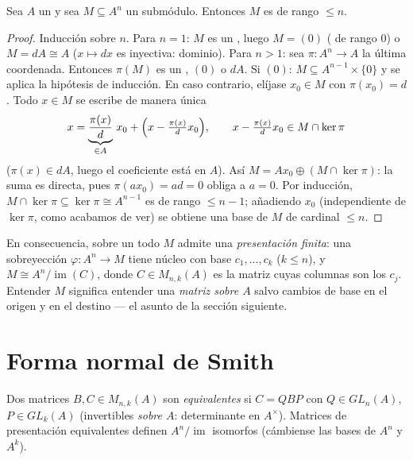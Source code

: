 \begin{theorem}\label{thm:b3:modules:submodule}
Sea $A$ un  y sea $M \subseteq A^n$ un
submódulo. Entonces $M$ es  de rango
$\leq n$.
\end{theorem}

\begin{proof}
Inducción sobre $n$. Para $n = 1$: $M$ es un
, luego $M = (0)$
( de rango $0$) o $M = dA \cong A$
($x \mapsto dx$ es inyectiva: dominio). Para $n > 1$: sea
$\pi \colon A^n \to A$ la última coordenada. Entonces $\pi(M)$ es un
, $(0)$ o $dA$. Si $(0)$:
$M \subseteq A^{n-1} \times \{0\}$ y se aplica la hipótesis de
inducción. En caso contrario, elíjase $x_0 \in M$ con $\pi(x_0) = d$.
Todo $x \in M$ se escribe de manera única
\[
x = \underbrace{\frac{\pi(x)}{d}}_{\in A}\, x_0 +
\Bigl(x - \tfrac{\pi(x)}d x_0\Bigr),
\qquad x - \tfrac{\pi(x)}d x_0 \in M \cap \ker\pi
\]
($\pi(x) \in dA$, luego el coeficiente está en $A$). Así $M = Ax_0
\oplus (M \cap \ker \pi)$: la suma es directa, pues $\pi(ax_0) =
ad = 0$ obliga a $a = 0$. Por inducción, $M \cap \ker\pi \subseteq
\ker \pi \cong A^{n-1}$ es  de rango
$\leq n - 1$; añadiendo $x_0$ (independiente de $\ker\pi$, como acabamos
de ver) se obtiene una base de $M$ de cardinal $\leq n$.
\end{proof}

\begin{remark}\label{rem:b3:modules:presentation}
En consecuencia, sobre un  todo
 $M$ admite una
\emph{presentación finita}: una sobreyección $\varphi\colon A^n \to M$
tiene núcleo  con base
$c_1, \dots, c_k$ ($k \leq n$), y $M
\cong A^n / \operatorname{im}(C)$, donde $C \in M_{n,k}(A)$ es la matriz
cuyas columnas son los $c_j$. Entender $M$ significa entender una
\emph{matriz sobre $A$} salvo cambios de base en el origen y en el
destino --- el asunto de la sección siguiente.
\end{remark}

\section{Forma normal de Smith}

\begin{definition}\label{def:b3:modules:equivalence}
Dos matrices $B, C \in M_{n,k}(A)$ son \emph{equivalentes} si $C =
QBP$ con $Q \in GL_n(A)$, $P \in GL_k(A)$ (invertibles \emph{sobre $A$}:
determinante en $A^\times$). Matrices de presentación equivalentes
definen  $A^n/
\operatorname{im}$ isomorfos (cámbiense las bases de $A^n$ y $A^k$).
\end{definition}

